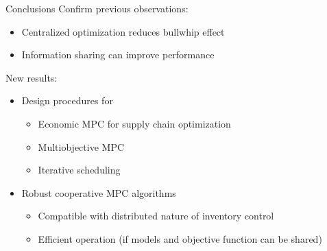 \documentclass[table]{beamer}
\begin{document}

\begin{frame}{Conclusions}
\alert{Confirm previous observations:}
\begin{itemize}
\item Centralized optimization reduces bullwhip effect
\item Information sharing  can improve performance
\end{itemize} 
\alert{New results:}
\begin{itemize}
\item Design procedures for 
 \begin{itemize}
   \item Economic MPC for supply chain optimization
   \item Multiobjective MPC 
   \item Iterative scheduling
 \end{itemize}
\item Robust cooperative MPC algorithms
  \begin{itemize}
    \item Compatible with distributed nature of inventory control
    \item Efficient operation (if models and objective function can be
      shared)
   \end{itemize}
\end{itemize}
\end{frame}
\end{document}
